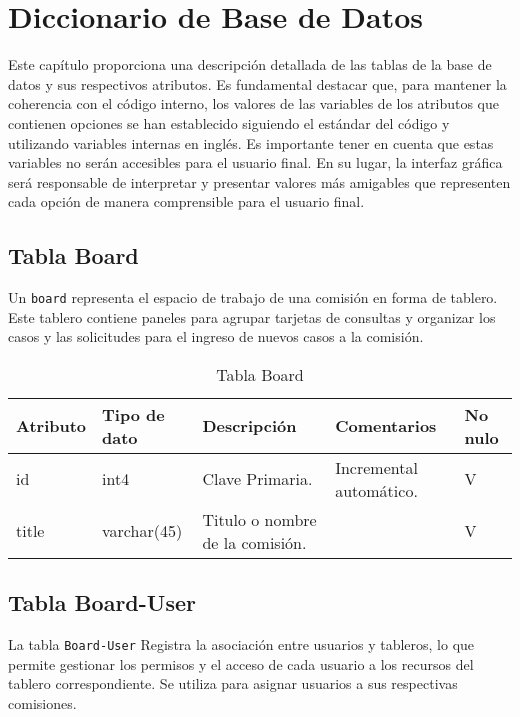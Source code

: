 \chapter{Diccionario de Base de Datos}\label{cap:dict-db}

Este capítulo proporciona una descripción detallada de las tablas de la base de datos y sus respectivos atributos. Es fundamental destacar que, para mantener la coherencia con el código interno, los valores de las variables de los atributos que contienen opciones se han establecido siguiendo el estándar del código y utilizando variables internas en inglés. Es importante tener en cuenta que estas variables no serán accesibles para el usuario final. En su lugar, la interfaz gráfica será responsable de interpretar y presentar valores más amigables que representen cada opción de manera comprensible para el usuario final.

\section{Tabla Board}\label{sec:table-board}
Un \texttt{board} representa el espacio de trabajo de una comisión en forma de tablero. Este tablero contiene paneles para agrupar tarjetas de consultas y organizar los casos y las solicitudes para el ingreso de nuevos casos a la comisión.

\begin{table}[htbp]
\centering
\label{tab:board}

\begin{tabular}{|p{3cm}|p{2.5cm}|p{4.5cm}|p{4cm}|p{1cm}|}
\hline
\textbf{Atributo} & \textbf{Tipo de dato}  & \textbf{Descripción} & \textbf{Comentarios} & \textbf{No nulo} \\ \hline
id & int4 & Clave Primaria. & Incremental automático. & V \\ \hline
title & varchar(45) & Titulo o nombre de la comisión. &  & V \\ \hline
\end{tabular}
\caption{Tabla Board}
\end{table}



\section{Tabla Board-User}\label{sec:table-board-user}
La tabla \texttt{Board-User} Registra la asociación entre usuarios y tableros, lo que permite gestionar los permisos y el acceso de cada usuario a los recursos del tablero correspondiente. Se utiliza para asignar usuarios a sus respectivas comisiones.


